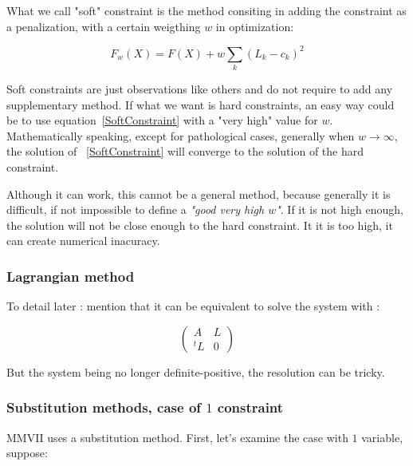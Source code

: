 What we call "soft" constraint is the method consiting in adding
the constraint as a penalization, with a certain weigthing $w$  in optimization:

\begin{equation}
    F_w(X) = F(X) + w  \sum_k (L_k-c_k)^2 \label{SoftConstraint}
\end{equation}

Soft constraints are just observations like others and do not require
to add any supplementary method. If what we want is hard constraints, an
easy way could be to use equation~\ref{SoftConstraint} with a "very high"
value for $w$.   Mathematically speaking, except for pathological cases,
generally when $w \rightarrow \infty$, the solution of ~\ref{SoftConstraint}
will converge to the solution of the hard constraint.

Although it can work, this cannot be a general method, because generally
it is difficult, if not impossible to define a \emph{"good very high $w$"}.
If it is not high enough, the solution will not be close enough to the hard
constraint.  It it is too high, it can create numerical inacuracy.


\subsubsection{Lagrangian method}

To detail later : mention that it can be equivalent to solve the system with :

\begin{equation}
  \begin{pmatrix}
   A & L \\
   ^t L & 0 
  \end{pmatrix}
\end{equation}

But the system being no longer definite-positive, the resolution can be tricky.


\subsubsection{Substitution methods, case of $1$ constraint}
\label{CSTR:SUBST}

MMVII uses a substitution method. First, let's examine the case with $1$ variable, suppose:

